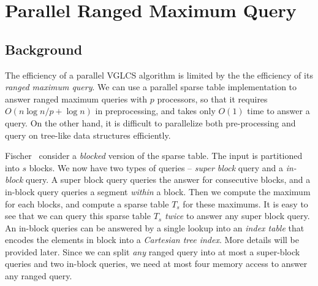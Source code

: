 \section{Parallel Ranged Maximum Query}
\label{sec:parallelRMQ}

\subsection{Background}

The efficiency of a parallel VGLCS algorithm is limited by the the
efficiency of its {\em ranged maximum query}.  We can use a parallel
sparse table implementation to answer ranged maximum queries with $p$
processors, so that it requires $O(n \log n / p + \log n)$ in
preprocessing, and takes only $O(1)$ time to answer a query.  On the
other hand, it is difficult to parallelize both pre-processing and
query on tree-like data structures efficiently.

Fischer~\cite{Fischer2006TheoreticalAP} consider a {\em blocked}
version of the sparse table.  The input is partitioned into $s$ blocks.
We now have two types of queries -- {\em super block} query and a {\em
  in-block} query.  A super block query queries the answer for
consecutive blocks, and a in-block query queries a segment {\em
  within} a block.  Then we compute the maximum for each blocks, and
compute a sparse table $T_s$ for these maximums.  It is easy to see
that we can query this sparse table $T_s$ {\em twice} to answer any
super block query.  An in-block queries can be answered by a single
lookup into an {\em index table} that encodes the elements in block
into a {\em Cartesian tree index}.  More details will be provided
later.  Since we can split {\em any} ranged query into at most a
super-block queries and two in-block queries, we need at most four
memory access to answer any ranged query.

